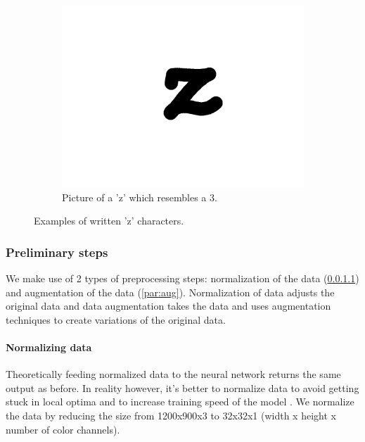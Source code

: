 \documentclass{article}
\begin{document}
\begin{figure}
\begin{subfigure}{0.15\textwidth}
  \includegraphics[width=\linewidth]{images/good_char}
  \caption{Picture of a 'z' which resembles a 3.}
\end{subfigure}
\caption{Examples of written 'z' characters.}
\label{fig:char}
\end{figure}


\subsubsection{Preliminary steps}
\label{sec:preproc}
We make use of 2 types of preprocessing steps: normalization of the data (\ref{par:norm}) and augmentation of the data (\ref{par:aug}). Normalization of data adjusts the original data and data augmentation takes the data and uses augmentation techniques to create variations of the original data.

\paragraph{Normalizing data} 
\label{par:norm}
Theoretically feeding normalized data to the neural network returns the same output as before. 
In reality however, it's better to normalize data to avoid getting stuck in local optima and to increase training speed of the model \cite{NormGoal}. We normalize the data by reducing the size from 1200x900x3 to 32x32x1 (width x height x number of color channels).


\end{document}
